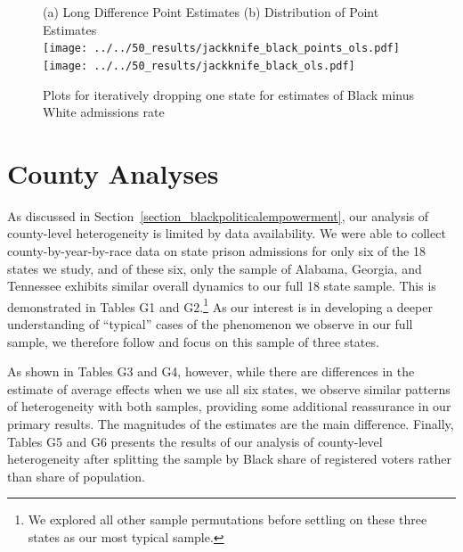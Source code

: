 \documentclass[12pt]{article}
\begin{document}
\begin{figure}[h!]
 	\begin{center}
 	\caption{ Plots for iteratively dropping one state for estimates of Black minus White admissions rate }
 	\footnotesize
		(a) Long Difference Point Estimates \hspace*{.4in} (b) Distribution of Point Estimates \\
 			\texttt{[image: ../../50\_results/jackknife\_black\_points\_ols.pdf]}
 			\texttt{[image: ../../50\_results/jackknife\_black\_ols.pdf]} \\
       \smallskip
       \label{figure_jackknife_bminusw}
       \end{center}
\end{figure} \normalsize







\section{County Analyses}\label{appendix_county}
\setcounter{table}{0}
\setcounter{figure}{0}
\renewcommand{\thetable}{G\arabic{table}}
\renewcommand{\thefigure}{G\arabic{figure}}
\normalsize

As discussed in Section~\ref{section_blackpoliticalempowerment}, our analysis of county-level heterogeneity is limited by data availability. We were able to collect county-by-year-by-race data on state prison admissions for only six of the 18 states we study, and of these six, only the sample of Alabama, Georgia, and Tennessee exhibits similar overall dynamics to our full 18 state sample. This is demonstrated in Tables G1 and G2.\footnote{We explored all other sample permutations before settling on these three states as our most typical sample.} As our interest is in developing a deeper understanding of ``typical'' cases of the phenomenon we observe in our full sample, we therefore follow  and focus on this sample of three states.

As shown in Tables G3 and G4, however, while there are differences in the estimate of average effects when we use all six states, we observe similar patterns of heterogeneity with both samples, providing some additional reassurance in our primary results.  The magnitudes of the estimates are the main difference.  Finally, Tables G5 and G6 presents the results of our analysis of county-level heterogeneity after splitting the sample by Black share of registered voters rather than share of population.
\end{document}

